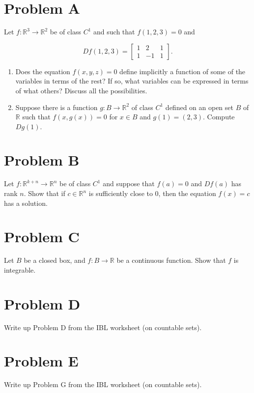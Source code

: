 \documentclass[lang=cn,11pt]{template}
\begin{document}
\section*{Problem A}
Let \( f : \mathbb{R}^3 \to \mathbb{R}^2 \) be of class \( C^1 \) and such that \( f(1, 2, 3) = 0 \) and

\[
Df(1, 2, 3) =
\begin{bmatrix}
1 & 2 & 1 \\
1 & -1 & 1
\end{bmatrix}
.
\]

\begin{enumerate}
    \item Does the equation \( f(x, y, z) = 0 \) define implicitly a function of some of the variables in terms of the rest? If so, what variables can be expressed in terms of what others? Discuss all the possibilities.
    \item Suppose there is a function \( g : B \to \mathbb{R}^2 \) of class \( C^1 \) defined on an open set \( B \) of \( \mathbb{R} \) such that \( f(x, g(x)) = 0 \) for \( x \in B \) and \( g(1) = (2, 3) \). Compute \( Dg(1) \).
\end{enumerate}

\section*{Problem B}
Let \( f : \mathbb{R}^{k+n} \to \mathbb{R}^n \) be of class \( C^1 \) and suppose that \( f(a) = 0 \) and \( Df(a) \) has rank \( n \). Show that if \( c \in \mathbb{R}^n \) is sufficiently close to 0, then the equation \( f(x) = c \) has a solution.

\section*{Problem C}
Let \( B \) be a closed box, and \( f : B \to \mathbb{R} \) be a continuous function. Show that \( f \) is integrable.

\section*{Problem D}
Write up Problem D from the IBL worksheet (on countable sets).

\section*{Problem E}
Write up Problem G from the IBL worksheet (on countable sets).
\end{document}
